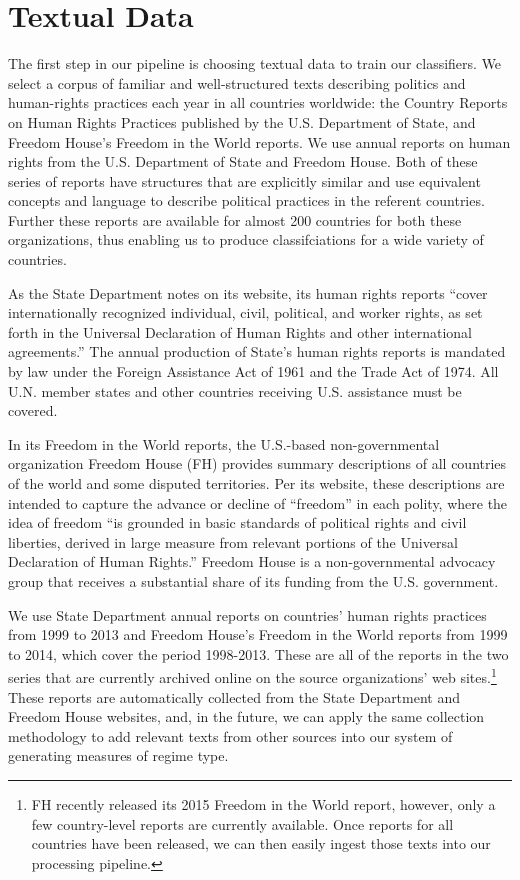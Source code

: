 \documentclass[pdftex,12pt,fullpage,oneside]{amsart}
\begin{document}
\section{Textual Data}

The first step in our pipeline is choosing textual data to train our classifiers. We select a corpus of familiar and well-structured texts describing politics and human-rights practices each year in all countries worldwide: the Country Reports on Human Rights Practices published by the U.S. Department of State, and Freedom House's Freedom in the World reports. We use annual reports on human rights from the U.S. Department of State and Freedom House. Both of these series of reports have structures that are explicitly similar and use equivalent concepts and language to describe political practices in the referent countries. Further these reports are available for almost 200 countries for both these organizations, thus enabling us to produce classifciations for a wide variety of countries. 

As the State Department notes on its website, its human rights reports ``cover internationally recognized individual, civil, political, and worker rights, as set forth in the Universal Declaration of Human Rights and other international agreements.'' The annual production of State's human rights reports is mandated by law under the Foreign Assistance Act of 1961 and the Trade Act of 1974. All U.N. member states and other countries receiving U.S. assistance must be covered. 

In its Freedom in the World reports, the U.S.-based non-governmental organization Freedom House (FH) provides summary descriptions of all countries of the world and some disputed territories. Per its website, these descriptions are intended to capture the advance or decline of ``freedom'' in each polity, where the idea of freedom ``is grounded in basic standards of political rights and civil liberties, derived in large measure from relevant portions of the Universal Declaration of Human Rights.'' Freedom House is a non-governmental advocacy group that receives a substantial share of its funding from the U.S. government.

We use State Department annual reports on countries' human rights practices from 1999 to 2013 and Freedom House's Freedom in the World reports from 1999 to 2014, which cover the period 1998-2013. These are all of the reports in the two series that are currently archived online on the source organizations' web sites.\footnote{FH recently released its 2015 Freedom in the World report, however, only a few country-level reports are currently available. Once reports for all countries have been released, we can then easily ingest those texts into our processing pipeline.} These reports are automatically collected from the State Department and Freedom House websites, and, in the future, we can apply the same collection methodology to add relevant texts from other sources into our system of generating measures of regime type.
\end{document}
